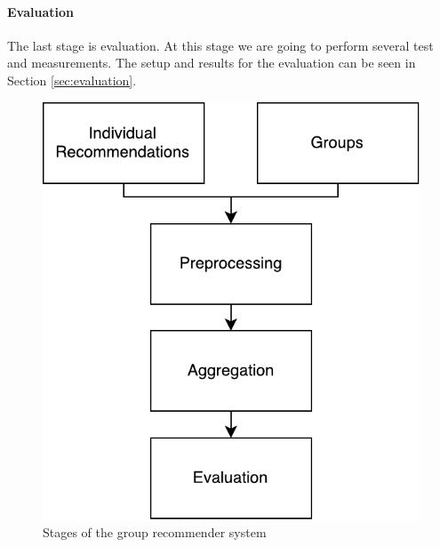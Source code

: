 \paragraph{Evaluation} The last stage is evaluation. At this stage we are going to perform several test and measurements. The setup and results for the evaluation can be seen in Section \ref{sec:evaluation}. 


\begin{figure}[t!]
\centering
\includegraphics[scale=.4]{graphics/composition}
\caption{Stages of the group recommender system}\label{fig:composition}
\end{figure}